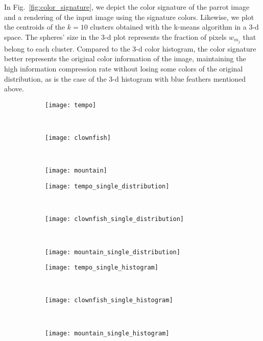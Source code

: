 In Fig.\ \ref{fig:color_signature}, we depict the color signature of the parrot image and a rendering of the input image using the signature colors. Likewise, we plot the centroids of the $k = 10$ clusters obtained with the k-means algorithm in a 3-d space. The spheres' size in the 3-d plot represents the fraction of pixels $w_{m_j}$ that belong to each cluster. Compared to the 3-d color histogram, the color signature better represents the original color information of the image, maintaining the high information compression rate without losing some colors of the original distribution, as is the case of the 3-d histogram with blue feathers mentioned above.

\begin{figure}[!ht]
    \centering
    \begin{subfigure}[t]{\textwidth+20pt\relax}
    	\texttt{[image: tempo]}
    \end{subfigure}~ 
    \begin{subfigure}[b]{0.32\textwidth}
        \texttt{[image: clownfish]}
    \end{subfigure}~
    \begin{subfigure}[b]{0.32\textwidth}
        \texttt{[image: mountain]}
    \end{subfigure}\vspace{5pt}
        
    \begin{subfigure}[t]{\textwidth+20pt\relax}
    	\texttt{[image: tempo\_single\_distribution]}
    \end{subfigure}~     
    \begin{subfigure}[b]{0.32\textwidth}
        \texttt{[image: clownfish\_single\_distribution]}
    \end{subfigure}~
    \begin{subfigure}[b]{0.32\textwidth}
        \texttt{[image: mountain\_single\_distribution]}
    \end{subfigure}%
    
    \begin{subfigure}[t]{\textwidth+20pt\relax}
    	\texttt{[image: tempo\_single\_histogram]}
    \end{subfigure}~     
    \begin{subfigure}[b]{0.32\textwidth}
        \texttt{[image: clownfish\_single\_histogram]}
    \end{subfigure}~
    \begin{subfigure}[b]{0.32\textwidth}
        \texttt{[image: mountain\_single\_histogram]}
    \end{subfigure}%
      

\end{figure}
